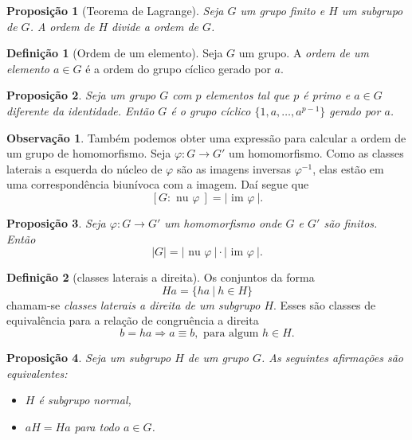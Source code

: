 \documentclass[a4paper,12pt]{report}
\theoremstyle{plain}
\newtheorem{proposicao}{Proposição}[section]
\theoremstyle{definition}
\newtheorem{definicao}{Definição}[section]
\newtheorem{observacao}{Observação}[section]
\begin{document}
\begin{proposicao}[Teorema de Lagrange]
	Seja \(G\) um grupo finito e
	\(H\) um subgrupo de \(G\). A ordem de \(H\) divide a ordem de \(G\).
\end{proposicao}

\begin{definicao}[Ordem de um elemento]
	Seja \(G\) um grupo. A \emph{ordem de um elemento \(a\in G\)} é a ordem do grupo cíclico gerado por \(a\).	
\end{definicao}

\begin{proposicao}
	Seja um grupo \(G\) com \(p\) elementos tal que
	\(p\) é primo e \(a\in G\) diferente da identidade. Então \(G\) é o
	grupo cíclico \(\{1,a,\dots,a^{p-1}\}\) gerado por \(a\).
\end{proposicao}

\begin{observacao}
	Também podemos obter uma expressão para calcular a ordem de um grupo de
	homomorfismo. Seja \(\varphi: G\longrightarrow G'\) um homomorfismo.
	Como as classes laterais a esquerda do núcleo de \(\varphi\) são as imagens
	inversas \(\varphi^{-1}\), elas estão em uma correspondência biunívoca
	com a imagem. Daí segue que
	\[[G:\text{ nu }\varphi\ ] = |\text{ im }\varphi\ |.\]
\end{observacao}

\begin{proposicao}
	Seja \(\varphi: G\longrightarrow G'\) um
	homomorfismo onde \(G\) e \(G'\) são finitos. Então
	\[|G| = |\text{ nu }\varphi\ |\cdot|\text{ im }\varphi\ |.\]	
\end{proposicao}

\begin{definicao}[classes laterais a direita]
	Os conjuntos da forma
	\[Ha = \{ha \ | \ h \in H\}\] chamam-se \emph{classes laterais a direita de um
		subgrupo \(H\)}. Esses são classes de equivalência para a relação de
	congruência a direita
	\[b = ha \Rightarrow a \equiv b, \text{ para algum }h \in H.\]	
\end{definicao}

\begin{proposicao}
	Seja um subgrupo \(H\) de um grupo \(G\). As
	seguintes afirmações são equivalentes:
	
	\begin{itemize}
		\item
		\(H\) é subgrupo normal,
		\item
		\(aH = Ha\) para todo \(a\in G\).
	\end{itemize}	
\end{proposicao}
\end{document}
